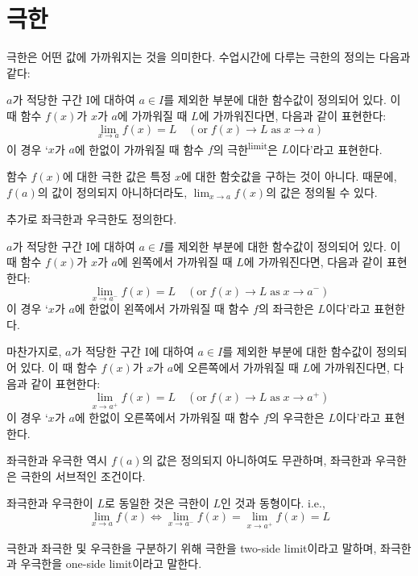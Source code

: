\documentclass[../note.tex]{subfiles}
\begin{document}
\section{극한}
극한은 어떤 값에 가까워지는 것을 의미한다. 수업시간에 다루는 극한의 정의는 다음과 같다:
\begin{definition}[극한]
  $a$가 적당한 구간 I에 대하여 $a \in I$를 제외한 부분에 대한 함수값이 정의되어 있다. 이 때 함수 $f(x)$가 $x$가 $a$에 가까워질 때 $L$에 가까워진다면, 다음과 같이 표현한다:
  \begin{equation}
    \lim_{x \to a} f(x) = L\quad (\text{or}\; f(x) \to L\; \text{as}\; x \to a)
  \end{equation}
  이 경우 `$x$가 $a$에 한없이 가까워질 때 함수 $f$의 극한\textsuperscript{limit}은 $L$이다'라고 표현한다.
\end{definition}
함수 $f(x)$에 대한 극한 값은 특정 $x$에 대한 함숫값을 구하는 것이 아니다. 때문에, $f(a)$의 값이 정의되지 아니하더라도, $\lim_{x \to a} f(x)$의 값은 정의될 수 있다.

추가로 좌극한과 우극한도 정의한다.

\begin{definition}
  $a$가 적당한 구간 I에 대하여 $a \in I$를 제외한 부분에 대한 함수값이 정의되어 있다. 이 때 함수 $f(x)$가 $x$가 $a$에 왼쪽에서 가까워질 때 $L$에 가까워진다면, 다음과 같이 표현한다:
  \begin{equation}
    \lim_{x \to a^-} f(x) = L\quad (\text{or}\; f(x) \to L\; \text{as}\; x \to a^-)
  \end{equation}
  이 경우 `$x$가 $a$에 한없이 왼쪽에서 가까워질 때 함수 $f$의 좌극한은 $L$이다'라고 표현한다.

  마찬가지로, $a$가 적당한 구간 I에 대하여 $a \in I$를 제외한 부분에 대한 함수값이 정의되어 있다. 이 때 함수 $f(x)$가 $x$가 $a$에 오른쪽에서 가까워질 때 $L$에 가까워진다면, 다음과 같이 표현한다:
  \begin{equation}
    \lim_{x \to a^+} f(x) = L\quad (\text{or}\; f(x) \to L\; \text{as}\; x \to a^+)
  \end{equation}
  이 경우 `$x$가 $a$에 한없이 오른쪽에서 가까워질 때 함수 $f$의 우극한은 $L$이다'라고 표현한다.
\end{definition}
좌극한과 우극한 역시 $f(a)$의 값은 정의되지 아니하여도 무관하며, 좌극한과 우극한은 극한의 서브적인 조건이다.
\begin{theorem}
  \label{theorem:relation-limit-one-side-limit}
  좌극한과 우극한이 $L$로 동일한 것은 극한이 $L$인 것과 동형이다. i.e.,
  \begin{equation}
    \lim_{x \to a} f(x) \Longleftrightarrow \lim_{x \to a^-} f(x) = \lim_{x \to a^+} f(x) = L
  \end{equation}
\end{theorem}
극한과 좌극한 및 우극한을 구분하기 위해 극한을 two-side limit이라고 말하며, 좌극한과 우극한을 one-side limit이라고 말한다.
\end{document}
